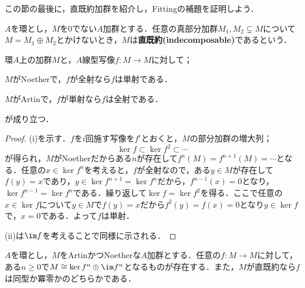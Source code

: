 
この節の最後に，直既約加群を紹介し，Fittingの補題を証明しよう．

\begin{defi}[直既約]
	$A$を環とし，$M$を$0$でない$A$加群とする．任意の真部分加群$M_1,M_2\subsetneq M$について$M=M_1\oplus M_2$とかけないとき，$M$は\textbf{直既約(indecomposable)}であるという．
\end{defi}

\begin{prop}\label{prop:Noether(Artin)加群の上でsunj->inj,inj->surj}
	環$A$上の加群$M$と，$A$線型写像$f:M\to M$に対して；
	\begin{sakura}
		\item $M$がNoetherで，$f$が全射なら$f$は単射である．
		\item $M$がArtinで，$f$が単射なら$f$は全射である．
	\end{sakura}
	が成り立つ．
\end{prop}

\begin{proof}
	(i)を示す．$f$を$i$回施す写像を$f^i$とおくと，$M$の部分加群の増大列；
	\[\ker f\subset\ker f^2\subset\cdots\]
	が得られ，$M$がNoetherだからある$n$が存在して$f^n(M)=f^{n+1}(M)=\cdots$となる．任意の$x\in\ker f^n$を考えると，$f$が全射なので，ある$y\in M$が存在して$f(y)=x$であり，$y\in\ker f^{n+1}=\ker f^n$だから，$f^{n-1}(x)=0$となり，$\ker f^{n-1}=\ker f^n$である．繰り返して$\ker f=\ker f^2$を得る．ここで任意の$x\in\ker f$について$y\in M$で$f(y)=x$だから$f^2(y)=f(x)=0$となり$y\in\ker f$で，$x=0$である．よって$f$は単射．
	
	(ii)は$\im f$を考えることで同様に示される．
\end{proof}

\begin{thm}[Fittingの補題]\label{thm:Fitting}
	$A$を環とし，$M$をArtinかつNoetherな$A$加群とする．任意の$f:M\to M$に対して，ある$n\geq 0$で$M\cong\ker f^n\oplus \im f^n$となるものが存在する．また，$M$が直既約なら$f$は同型か冪零かのどちらかである．
\end{thm}

